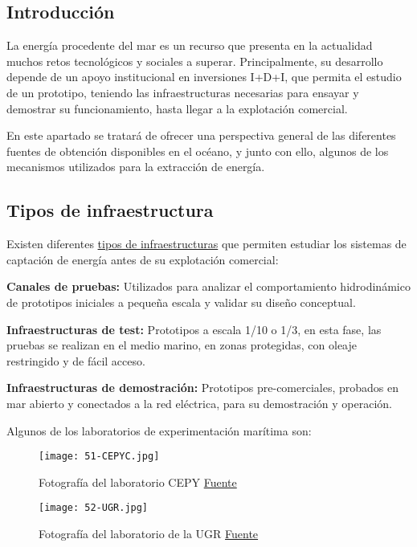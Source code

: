 \subsection{Introducción}\label{header-n3}

La energía procedente del mar es un recurso que presenta en la
actualidad muchos retos tecnológicos y sociales a superar.
Principalmente, su desarrollo depende de un apoyo institucional en
inversiones I+D+I, que permita el estudio de un prototipo, teniendo las
infraestructuras necesarias para ensayar y demostrar su funcionamiento,
hasta llegar a la explotación comercial.

En este apartado se tratará de ofrecer una perspectiva general de las
diferentes fuentes de obtención disponibles en el océano, y junto con
ello, algunos de los mecanismos utilizados para la extracción de
energía.

\subsection{Tipos de infraestructura}\label{header-n8}

Existen diferentes
\href{http://www.udc.es/iuem/documentos/doc_xornadas/anaeco/APROVEITAMENTODAENERXIADASOLAS.pdf}{tipos
de infraestructuras} que permiten estudiar los sistemas de captación de
energía antes de su explotación comercial:

\textbf{Canales de pruebas:} Utilizados para analizar el comportamiento
hidrodinámico de prototipos iniciales a pequeña escala y validar su
diseño conceptual.

\textbf{Infraestructuras de test:} Prototipos a escala 1/10 o 1/3, en
esta fase, las pruebas se realizan en el medio marino, en zonas
protegidas, con oleaje restringido y de fácil acceso.

\textbf{Infraestructuras de demostración:} Prototipos pre-comerciales,
probados en mar abierto y conectados a la red eléctrica, para su
demostración y operación.

Algunos de los laboratorios de experimentación marítima son:

\begin{figure}
\centering
\texttt{[image: 51-CEPYC.jpg]}
\caption[Laboratorio CEPY]{Fotografía del laboratorio CEPY \href{http://www.cedex.es/CEDEX/LANG_CASTELLANO/ORGANISMO/CENTYLAB/CEPYC/EQUIPAMIENTO/LEM0.htm}{Fuente}}
\label{fig:CEYPY}
\end{figure}

\begin{figure}
\centering
\texttt{[image: 52-UGR.jpg]}
\caption[Laboratorio de la UGR]{Fotografía del laboratorio de la UGR \href{http://doctorados.ugr.es/dinamicaambiental/pages/investigacion/recursos_instalaciones}{Fuente}}
\label{fig:UGR}
\end{figure}

